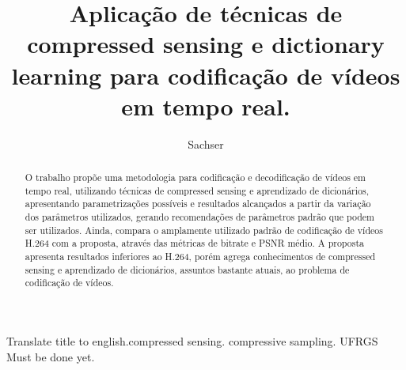 \documentclass[cic,tc]{iiufrgs}
\title{Aplicação de técnicas de compressed sensing e dictionary learning para codificação de vídeos em tempo real.}
\author{Sachser}{Eduardo}
\begin{document}
\maketitle





\begin{abstract}
    O trabalho propõe uma metodologia para codificação e decodificação de 
    vídeos em tempo real, utilizando técnicas de compressed sensing e aprendizado 
    de dicionários, apresentando parametrizações possíveis e resultados alcançados 
    a partir da variação dos parâmetros utilizados, gerando recomendações de parâmetros 
    padrão que podem ser utilizados.
    Ainda, compara o amplamente utilizado padrão de codificação de vídeos H.264
    com a proposta, através das métricas de bitrate e PSNR médio.
    A proposta apresenta resultados inferiores ao H.264, porém agrega conhecimentos
    de compressed sensing e aprendizado de dicionários, assuntos bastante atuais, 
    ao problema de codificação de vídeos.
\end{abstract}

\begin{englishabstract}{Translate title to english.}{compressed sensing. compressive sampling. UFRGS}
    Must be done yet.
\end{englishabstract}

\listoffigures

\listoftables
\end{document}
